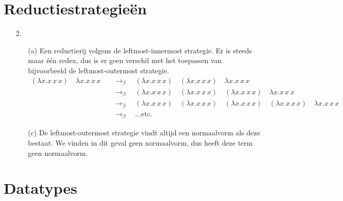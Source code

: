 \documentclass[a4paper,11pt]{article}
\begin{document}
\section{Reductiestrategie\"en}


\begin{enumerate}


\item[2.]

\begin{enumerate}
\item[(a)]
Een reductierij volgens de leftmost-innermost strategie. Er is steeds maar \'e\'en redex,
dus is er geen verschil met het toepassen van bijvoorbeeld de leftmost-outermost strategie.
\begin{align*}
  (\lambda x. x \, x \, x) \quad \lambda x. x \, x \, x
  & \quad \rightarrow_{\beta} \quad
  (\lambda x. x \, x \, x) \quad (\lambda x. x \, x \, x) \quad \lambda x. x \, x \, x\\
  & \quad \rightarrow_{\beta} \quad
  (\lambda x. x \, x \, x) \quad (\lambda x. x \, x \, x) \quad (\lambda x. x \, x \, x) \quad \lambda x. x \, x \, x\\
  & \quad \rightarrow_{\beta} \quad
  (\lambda x. x \, x \, x) \quad (\lambda x. x \, x \, x) \quad (\lambda x. x \, x \, x) \quad (\lambda x. x \, x \, x) \quad \lambda x. x \, x \, x\\
  & \quad \rightarrow_{\beta} \quad
  \ldots \text{etc.}
\end{align*}

\item[(c)]
De leftmost-outermost strategie vindt altijd een normaalvorm als deze bestaat.
We vinden in dit geval geen normaalvorm, dus heeft deze term geen normaalvorm.

\end{enumerate}


\end{enumerate}


\section{Datatypes}
\end{document}
